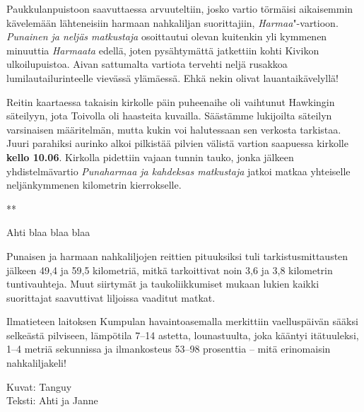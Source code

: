 \begin{multicols}{2}
Paukkulanpuistoon saavuttaessa arvuuteltiin, josko vartio törmäisi 
aikaisemmin kävelemään lähteneisiin harmaan nahkaliljan suorittajiin, 
\textit{Harmaa}"-vartioon. \textit{Punainen ja neljäs matkustaja} osoittautui 
olevan kuitenkin yli kymmenen minuuttia \textit{Harmaata} edellä, joten 
pysähtymättä jatkettiin kohti Kivikon ulkoilupuistoa. Aivan sattumalta 
vartiota tervehti neljä rusakkoa lumilautailurinteelle vievässä 
ylämäessä. Ehkä nekin olivat lauantaikävelyllä!

Reitin kaartaessa takaisin kirkolle päin puheenaihe oli vaihtunut Hawkingin 
säteilyyn, jota Toivolla oli haasteita kuvailla. Säästämme lukijoilta 
säteilyn varsinaisen määritelmän, mutta kukin voi halutessaan sen verkosta 
tarkistaa. Juuri parahiksi aurinko alkoi pilkistää pilvien välistä vartion 
saapuessa kirkolle \textbf{kello 10.06}. Kirkolla pidettiin vajaan tunnin 
tauko, jonka jälkeen yhdistelmävartio \textit{Punaharmaa ja kahdeksas 
matkustaja} jatkoi matkaa yhteiselle neljänkymmenen kilometrin kierrokselle. 

{\smallskip\noindent\centering ***\par\smallskip}

Ahti blaa blaa blaa

Punaisen ja harmaan nahkaliljojen reittien pituuksiksi tuli tarkistusmittausten 
jälkeen 49,4 ja 59,5 kilometriä, mitkä tarkoittivat noin 3,6 ja 3,8 
kilometrin tuntivauhteja. Muut siirtymät ja taukoliikkumiset mukaan lukien 
kaikki suorittajat saavuttivat liljoissa vaaditut matkat. 

Ilmatieteen laitoksen Kumpulan havaintoasemalla merkittiin vaelluspäivän 
sääksi selkeästä pilviseen, lämpötila 7--14 astetta, lounastuulta, joka 
kääntyi itätuuleksi, 1--4 metriä sekunnissa ja ilmankosteus 53--98 
prosenttia -- mitä erinomaisin nahkaliljakeli!
\end{multicols}

\vfill

\noindent\null\hfill Kuvat: Tanguy\\
\noindent\null\hfill Teksti: Ahti ja Janne

